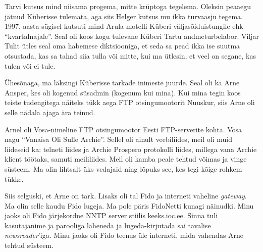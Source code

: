 Tarvi kutsus mind niisama progema, mitte krüptoga tegelema. Oleksin peaaegu jätnud
Küberisse tulemata, aga siis Helger kutsus mu ikka turvaasju tegema. 1997. aasta sügisel
kutsuti mind Arula motelli Küberi väljasõiduistungile ehk \enquote{kvartalnajale}. Seal oli koos kogu tulevane
Küberi Tartu andmeturbelabor. Viljar
Tulit ütles seal oma habemese diktsiooniga, et seda
sa pead ikka ise suutma otsustada, kas sa tahad siia tulla
või mitte, kui ma ütlesin, et veel on segane, kas tulen või ei tule.

Ühesõnaga, ma läksingi Küberisse tarkade inimeste juurde. Seal oli ka Arne
Ansper, kes oli kogenud süsadmin
(kogenum kui mina). Kui mina tegin koos teiste tudengitega näiteks tükk aega FTP otsingumootorit
Nuuskur, siis Arne oli selle
nädala ajaga ära teinud. 

Arnel oli Vosa-nimeline FTP
otsingumootor Eesti FTP-serverite kohta. Vosa nagu \enquote{Vanaisa Oli Sulle
Archie}. Sellel oli ainult veebiliides, meil oli
muid liideseid ka: telneti liides ja Archie Prospero
protokolli liides, millega
vana Archie klient töötaks, samuti meililiides. Meil oli kamba peale tehtud võimas ja vinge süsteem. Ma olin lihtsalt üks
vedajaid ning lõpuks see, kes tegi kõige rohkem tükke. 

Siis selguski, et
Arne on tark. Lisaks oli tal Fido ja
interneti vaheline \emph{gateway}. Ma olin selle kaudu
Fido lugeja. Ma pole päris FidoNetti kunagi
näinudki. Minu jaoks oli Fido järjekordne
NNTP server stiilis
keeks.ioc.ee. Sinna tuli kasutajanime ja parooliga
läheneda ja lugeda-kirjutada sai tavalise \emph{newsreader}'iga. Minu jaoks
oli Fido teenus üle interneti, mida vahendas Arne tehtud süsteem.


